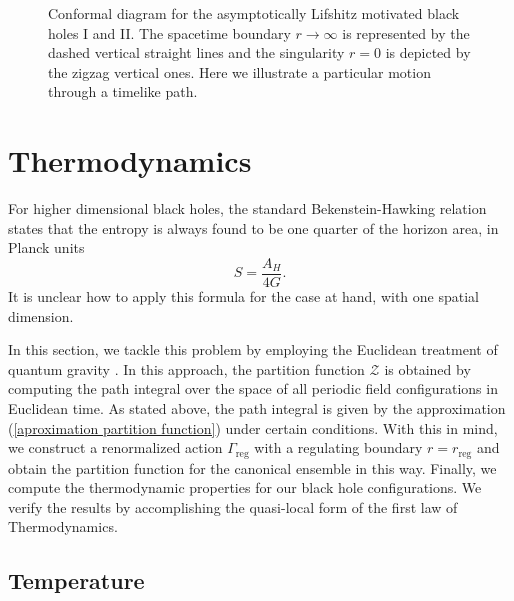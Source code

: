 \documentclass[sn-mathphys,Numbered]{sn-jnl}%
\theoremstyle{thmstyleone}%
\theoremstyle{thmstyletwo}%
\theoremstyle{thmstylethree}%
\begin{document}
\begin{figure}
\caption{Conformal diagram for the asymptotically Lifshitz motivated black holes I and II. The spacetime boundary $r \rightarrow \infty$ is represented by the dashed vertical straight lines and the singularity $r=0$ is depicted by the zigzag vertical ones. Here we illustrate a particular motion through a timelike path.}
\label{Penrose diagram}
\end{figure}

\section{Thermodynamics} \label{sec4}

For higher dimensional black holes, the standard Bekenstein-Hawking relation states that the entropy is always found to be one quarter of the horizon area, in Planck units
%
\begin{equation}
    S=\frac{A_H}{4G}.
\end{equation}
%
It is unclear how to apply this formula for the case at hand, with one spatial dimension. 

 In this section, we tackle this problem by employing the Euclidean treatment of quantum gravity \cite{Gibbons}. In this approach, the partition function $\mathcal{Z}$ is obtained by computing the path integral over the space of all periodic field configurations in Euclidean time. As stated above, the path integral is given by the approximation (\ref{aproximation partition function}) under certain conditions. With this in mind, we construct a renormalized action $\Gamma_{\text{reg}}$ with a regulating boundary $r=r_{\text{reg}}$ and obtain the partition function for the canonical ensemble in this way. Finally, we compute the thermodynamic properties for our black hole configurations. We verify the results by accomplishing the quasi-local form of the first law of Thermodynamics.   

\subsection{Temperature}
\end{document}
